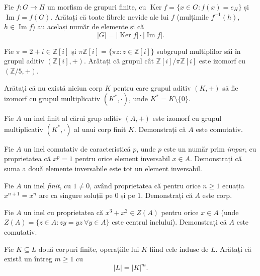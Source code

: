 \begin{problema}[Clasică]
Fie $f:G\to H$ un morfism de grupuri finite, cu
$\operatorname{Ker}f=\{x\in G:f(x)=e_{H}\}$ și $\operatorname{Im}f=f(G)$.
Arătați că toate fibrele nevide ale lui $f$ (mulțimile
$f^{-1}(h)$, $h\in\operatorname{Im}f$) au același număr de elemente
și că
\[
  |G|=|\operatorname{Ker}f|\cdot|\operatorname{Im}f| .
\]
\end{problema}

\begin{problema}
Fie $\pi=2+i\in\mathbb{Z}[i]$ și $\pi\mathbb{Z}[i]=\{\pi z : z\in\mathbb{Z}[i]\}$
subgrupul multiplilor săi în grupul aditiv $(\mathbb{Z}[i],+)$.
Arătați că grupul cât $\mathbb{Z}[i]/\pi\mathbb{Z}[i]$ este
izomorf cu $(\mathbb{Z}/5,+)$.
\end{problema}

\begin{problema}[Clasică]
Arătați că nu există niciun corp $K$ pentru care grupul
aditiv $(K,+)$ să fie izomorf cu grupul multiplicativ
$(K^{*},\cdot)$, unde $K^{*}=K\setminus\{0\}$.
\end{problema}

\begin{problema}
Fie $A$ un inel finit al cărui grup aditiv $(A,+)$ este izomorf cu grupul
multiplicativ $(K^{*},\cdot)$ al unui corp finit $K$. Demonstrați că
$A$ este comutativ.
\end{problema}

\begin{problema}
Fie $A$ un inel comutativ de caracteristică $p$, unde $p$ este un
număr prim \emph{impar}, cu proprietatea că $x^{p}=1$ pentru orice
element inversabil $x\in A$. Demonstrați că suma a două elemente
inversabile este tot un element inversabil.
\end{problema}

\begin{problema}
Fie $A$ un inel \emph{finit}, cu $1\neq 0$, având proprietatea că
pentru orice $n\ge 1$ ecuația $x^{n+1}=x^{n}$ are ca singure soluții
pe $0$ și pe $1$. Demonstrați că $A$ este corp.
\end{problema}

\begin{problema}
Fie $A$ un inel cu proprietatea că $x^{3}+x^{2}\in Z(A)$ pentru orice
$x\in A$ (unde $Z(A)=\{z\in A: zy=yz\ \forall y\in A\}$ este centrul
inelului). Demonstrați că $A$ este comutativ.
\end{problema}


\begin{problema}[Clasică]
Fie $K \subseteq L$ două corpuri finite, operațiile lui $K$ fiind cele induse de $L$. Arătați că există un întreg $m \geq 1$ cu
\[
  |L| = |K|^m.
\]
\end{problema}

